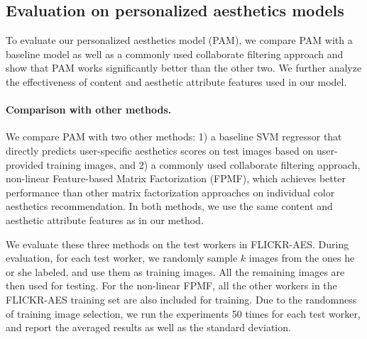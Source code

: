 \subsection{Evaluation on personalized aesthetics models}

To evaluate our personalized aesthetics model (PAM), we compare PAM with a baseline model as well as a commonly used collaborate filtering approach and show that PAM works significantly better than the other two. We further analyze the effectiveness of content and aesthetic attribute features used in our model.


\paragraph{Comparison with other methods.} We compare PAM with two other methods: 1) a baseline SVM regressor that directly predicts user-specific aesthetics scores on test images based on user-provided training images, and 2) a commonly used collaborate filtering approach, non-linear Feature-based Matrix Factorization (FPMF), which achieves better performance than other matrix factorization approaches on individual color aesthetics recommendation\cite{o2014collaborative}. In both methods, we use the same content and aesthetic attribute features as in our method. 




We evaluate these three methods on the test workers in FLICKR-AES. During evaluation, for each test worker, we randomly sample $k$ images from the ones he or she labeled, and use them as training images. All the remaining images are then used for testing. For the non-linear FPMF, all the other workers in the FLICKR-AES training set are also included for training. Due to the randomness of training image selection, we run the experiments 50 times for each test worker, and report the averaged results as well as the standard deviation. 

